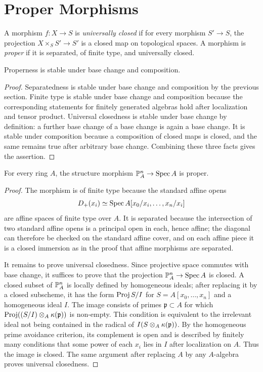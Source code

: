 \section{Proper Morphisms}

\begin{definition}
A morphism \(f:X\to S\) is \emph{universally closed} if for every morphism
\(S'\to S\), the projection \(X\times_S S'\to S'\) is a closed map on
topological spaces.  A morphism is \emph{proper} if it is separated, of finite
type, and universally closed.
\end{definition}

\begin{proposition}
Properness is stable under base change and composition.
\end{proposition}

\begin{proof}
Separatedness is stable under base change and composition by the previous
section.  Finite type is stable under base change and composition because the
corresponding statements for finitely generated algebras hold after
localization and tensor product.  Universal closedness is stable under base
change by definition: a further base change of a base change is again a base
change.  It is stable under composition because a composition of closed maps is
closed, and the same remains true after arbitrary base change.  Combining these
three facts gives the assertion.
\end{proof}

\begin{theorem}
For every ring \(A\), the structure morphism \(\mathbb{P}^n_A\to\operatorname{Spec} A\) is proper.
\end{theorem}

\begin{proof}
The morphism is of finite type because the standard affine opens
\[
    D_+(x_i)\simeq \operatorname{Spec} A[x_0/x_i,\ldots,x_n/x_i]
\]
are affine spaces of finite type over \(A\).  It is separated because the
intersection of two standard affine opens is a principal open in each, hence
affine; the diagonal can therefore be checked on the standard affine cover, and
on each affine piece it is a closed immersion as in the proof that affine
morphisms are separated.

It remains to prove universal closedness.  Since projective space commutes with
base change, it suffices to prove that the projection \(\mathbb{P}^n_A\to\operatorname{Spec} A\) is
closed.  A closed subset of \(\mathbb{P}^n_A\) is locally defined by homogeneous
ideals; after replacing it by a closed subscheme, it has the form
\(\operatorname{Proj} S/I\) for \(S=A[x_0,\ldots,x_n]\) and a homogeneous ideal \(I\).  The
image consists of primes \(\mathfrak p\subset A\) for which
\(\operatorname{Proj}((S/I)\otimes_A\kappa(\mathfrak p))\) is non-empty.  This condition is
equivalent to the irrelevant ideal not being contained in the radical of
\(I(S\otimes_A\kappa(\mathfrak p))\).  By the homogeneous prime avoidance
criterion, its complement is open and is described by finitely many conditions
that some power of each \(x_i\) lies in \(I\) after localization on \(A\).  Thus
the image is closed.  The same argument after replacing \(A\) by any
\(A\)-algebra proves universal closedness.
\end{proof}

